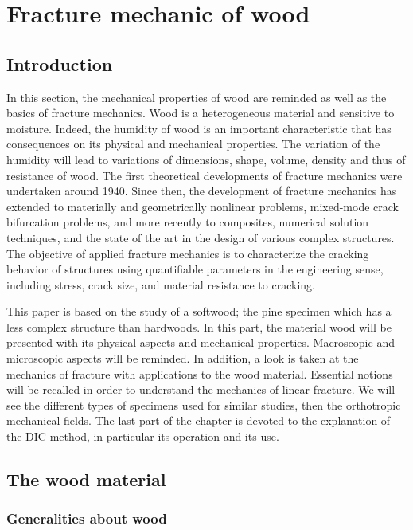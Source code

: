 \chapter{Fracture mechanic of wood}
\label{Chapter1}

\section{Introduction}

In this section, the mechanical properties of wood are reminded as well as the basics of fracture mechanics. 
Wood is a heterogeneous material and sensitive to moisture. Indeed, the humidity of wood is an important characteristic that has consequences on its physical and mechanical properties. The variation of the humidity will lead to variations of dimensions, shape, volume, density and thus of resistance of wood. 
The first theoretical developments of fracture mechanics were undertaken around 1940. Since then, the development of fracture mechanics has extended to materially and geometrically nonlinear problems, mixed-mode crack bifurcation problems, and more recently to composites, numerical solution techniques, and the state of the art in the design of various complex structures. The objective of applied fracture mechanics is to characterize the cracking behavior of structures using quantifiable parameters in the engineering sense, including stress, crack size, and material resistance to cracking.

This paper is based on the study of a softwood; the pine specimen which has a less complex structure than hardwoods. In this part, the material wood will be presented with its physical aspects and mechanical properties. Macroscopic and microscopic aspects will be reminded.
In addition, a look is taken at the mechanics of fracture with applications to the wood material. Essential notions will be recalled in order to understand the mechanics of linear fracture. We will see the different types of specimens used for similar studies, then the orthotropic mechanical fields. The last part of the chapter is devoted to the explanation of the DIC method, in particular its operation and its use.

\section{The wood material}

\subsection{Generalities about wood}


